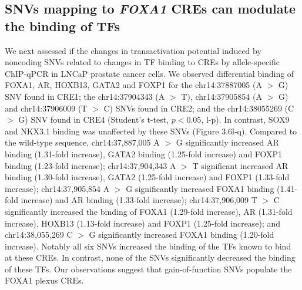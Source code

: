 \subsection{SNVs mapping to \emph{FOXA1} CREs can modulate the binding of TFs}

We next assessed if the changes in transactivation potential induced by noncoding SNVs related to changes in TF binding to CREs by allele-specific ChIP-qPCR \cite{baileyNoncodingSomaticInherited2016,zhangIntegrativeFunctionalGenomics2012,cowper-sal*lariBreastCancerRisk2012} in LNCaP prostate cancer cells.
We observed differential binding of FOXA1, AR, HOXB13, GATA2 and FOXP1 for the chr14:37887005 (A $>$ G) SNV found in CRE1; the chr14:37904343 (A $>$ T), chr14:37905854 (A $>$ G) and chr14:37906009 (T $>$ C) SNVs found in CRE2; and the chr14:38055269 (C $>$ G) SNV found in CRE4 (Student’s t-test, $p<0.05$, l-p).
In contrast, SOX9 and NKX3.1 binding was unaffected by these SNVs (Figure  3.6l-q).
Compared to the wild-type sequence, chr14:37,887,005 A $>$ G significantly increased AR binding (1.31-fold increase), GATA2 binding (1.25-fold increase) and FOXP1 binding (1.23-fold increase); chr14:37,904,343 A $>$ T significant increased AR binding (1.30-fold increase), GATA2 (1.25-fold increase) and FOXP1 (1.33-fold increase); chr14:37,905,854 A $>$ G significantly increased FOXA1 binding (1.41-fold increase) and AR binding (1.33-fold increase); chr14:37,906,009 T $>$ C significantly increased the binding of FOXA1 (1.29-fold increase), AR (1.31-fold increase), HOXB13 (1.13-fold increase) and FOXP1 (1.25-fold increase); and chr14:38,055,269 C $>$ G significantly increased FOXA1 binding (1.20-fold increase).
Notably all six SNVs increased the binding of the TFs known to bind at these CREs.
In contrast, none of the SNVs significantly decreased the binding of these TFs.
Our observations suggest that gain-of-function SNVs populate the FOXA1 plexus CREs.
